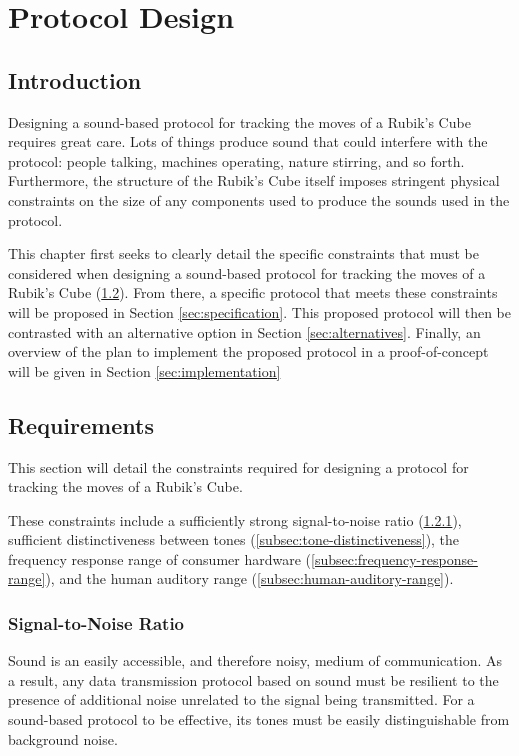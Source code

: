 \chapter{Protocol Design} %

\label{Chapter4} %


\section{Introduction}
Designing a sound-based protocol for tracking the moves of a Rubik's Cube requires great care.
Lots of things produce sound that could interfere with the protocol: people talking, machines operating, nature stirring, and so forth.
Furthermore, the structure of the Rubik's Cube itself imposes stringent physical constraints on the size of any components used to produce the sounds used in the protocol.

This chapter first seeks to clearly detail the specific constraints that must be considered when designing a sound-based protocol for tracking the moves of a Rubik's Cube (\ref{sec:requirements}).
From there, a specific protocol that meets these constraints will be proposed in Section \ref{sec:specification}.
This proposed protocol will then be contrasted with an alternative option in Section \ref{sec:alternatives}.
Finally, an overview of the plan to implement the proposed protocol in a proof-of-concept will be given in Section \ref{sec:implementation}


\section{Requirements}
\label{sec:requirements}
This section will detail the constraints required for designing a protocol for tracking the moves of a Rubik's Cube.

These constraints include a sufficiently strong signal-to-noise ratio (\ref{subsec:signal-to-noise-ratio}), sufficient distinctiveness between tones (\ref{subsec:tone-distinctiveness}), the frequency response range of consumer hardware (\ref{subsec:frequency-response-range}), and the human auditory range (\ref{subsec:human-auditory-range}).

\subsection{Signal-to-Noise Ratio}
\label{subsec:signal-to-noise-ratio}
Sound is an easily accessible, and therefore noisy, medium of communication.
As a result, any data transmission protocol based on sound must be resilient to the presence of additional noise unrelated to the signal being transmitted.
For a sound-based protocol to be effective, its tones must be easily distinguishable from background noise.

